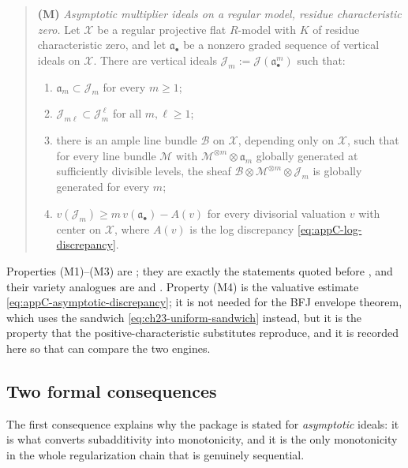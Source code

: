 \begin{quote}
\textbf{(M)} \emph{Asymptotic multiplier ideals on a regular model, residue
characteristic zero.}  Let \(\mathcal X\) be a regular projective flat
\(R\)-model with \(K\) of residue characteristic zero, and let
\(\mathfrak a_\bullet\) be a nonzero graded sequence of vertical ideals on
\(\mathcal X\).  There are vertical ideals
\(\mathcal J_m:=\mathcal J(\mathfrak a_\bullet^m)\) such that:
\begin{enumerate}
\item[(M1)] \(\mathfrak a_m\subset\mathcal J_m\) for every \(m\geq1\);
\item[(M2)] \(\mathcal J_{m\ell}\subset\mathcal J_m^{\,\ell}\) for all
\(m,\ell\geq1\);
\item[(M3)] there is an ample line bundle \(\mathcal B\) on
\(\mathcal X\), depending only on \(\mathcal X\), such that for every line
bundle \(\mathcal M\) with \(\mathcal M^{\otimes m}\otimes\mathfrak a_m\)
globally generated at sufficiently divisible levels, the sheaf
\(\mathcal B\otimes\mathcal M^{\otimes m}\otimes\mathcal J_m\) is globally
generated for every \(m\);
\item[(M4)] \(v(\mathcal J_m)\geq m\,v(\mathfrak a_\bullet)-A(v)\) for every
divisorial valuation \(v\) with center on \(\mathcal X\), where \(A(v)\) is
the log discrepancy \eqref{eq:appC-log-discrepancy}.
\end{enumerate}
\end{quote}

Properties (M1)--(M3) are \cite[Theorem~B.8 and Remark~B.9]{BFJ16}; they are
exactly the statements quoted before
, and their variety analogues are
 and
.  Property (M4) is the
valuative estimate \eqref{eq:appC-asymptotic-discrepancy}; it is not needed
for the BFJ envelope theorem, which uses the sandwich
\eqref{eq:ch23-uniform-sandwich} instead, but it is the property that the
positive-characteristic substitutes reproduce, and it is recorded here so
that  can compare the two engines.

\subsection{Two formal consequences}

The first consequence explains why the package is stated for
\emph{asymptotic} ideals: it is what converts subadditivity into
monotonicity, and it is the only monotonicity in the whole regularization
chain that is genuinely sequential.


